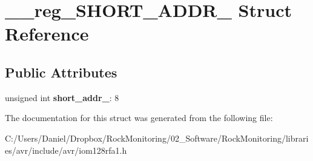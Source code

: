 \hypertarget{struct____reg___s_h_o_r_t___a_d_d_r__1}{}\section{\+\_\+\+\_\+reg\+\_\+\+S\+H\+O\+R\+T\+\_\+\+A\+D\+D\+R\+\_ Struct Reference}
\label{struct____reg___s_h_o_r_t___a_d_d_r__1}
\subsection*{Public Attributes}
\begin{DoxyCompactItemize}
\item 
unsigned int {\bfseries short\+\_\+addr\+\_}\+: 8\hypertarget{struct____reg___s_h_o_r_t___a_d_d_r__1_ac3ab257b98c5f511f83855d4cb81db7f}{}\label{struct____reg___s_h_o_r_t___a_d_d_r__1_ac3ab257b98c5f511f83855d4cb81db7f}

\end{DoxyCompactItemize}


The documentation for this struct was generated from the following file\+:\begin{DoxyCompactItemize}
\item 
C\+:/\+Users/\+Daniel/\+Dropbox/\+Rock\+Monitoring/02\+\_\+\+Software/\+Rock\+Monitoring/libraries/avr/include/avr/iom128rfa1.\+h\end{DoxyCompactItemize}
